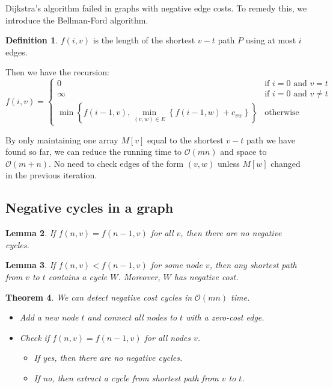 \documentclass[10pt, oneside, reqno]{amsart}
\theoremstyle{plain}%
\newtheorem{thm}{Theorem}[section]
\newtheorem{lem}[thm]{Lemma}
\theoremstyle{definition}
\newtheorem{defn}[thm]{Definition}
\theoremstyle{remark}
\newcommand{\bigo}[1]{\mathcal{O}(#1)}
\begin{document}
Dijkstra's algorithm failed in graphs with negative edge costs.  To remedy this, we introduce the Bellman-Ford algorithm.

\begin{defn}
	$f(i,v)$ is the length of the shortest $v-t$ path $P$ using at most $i$ edges.
\end{defn}

Then we have the recursion:
\[
	f(i,v) = \begin{cases}
		0 						&\text{if $i = 0$ and $v=t$}\\
		\infty 					&\text{if $i = 0$ and $v \neq t$}\\
		\min \left\{ f(i-1,v), \displaystyle\min_{(v,w)\in E} \left\{f(i-1,w) + c_{vw}\right\} \right\} &\text{otherwise}
	\end{cases}
\]

By only maintaining one array $M[v]$ equal to the shortest $v-t$ path we have found so far, we can reduce the running time to $\bigo{mn}$ and space to $\bigo{m+n}$.
No need to check edges of the form $(v,w)$ unless $M[w]$ changed in the previous iteration.


\subsection{Negative cycles in a graph} %
\label{sub:negative_cycles_in_a_graph}

\begin{lem}
	If $f(n,v) = f(n-1,v)$ for all $v$, then there are no negative cycles.
\end{lem}

\begin{lem}
	If $f(n,v) < f(n-1,v)$ for some node $v$, then any shortest path from $v$ to $t$ contains a cycle $W$.  Moreover, $W$ has negative cost.
\end{lem}

\begin{thm}
	We can detect negative cost cycles in $\bigo{mn}$ time. 
	\begin{itemize}
		\item Add a new node $t$ and connect all nodes to $t$ with a zero-cost edge.
		\item Check if $f(n,v) = f(n-1,v)$ for all nodes $v$.
		\begin{itemize}
			\item If yes, then there are no negative cycles.
			\item If no, then extract a cycle from shortest path from $v$ to $t$.
		\end{itemize}
	\end{itemize}
\end{thm}
\end{document}
